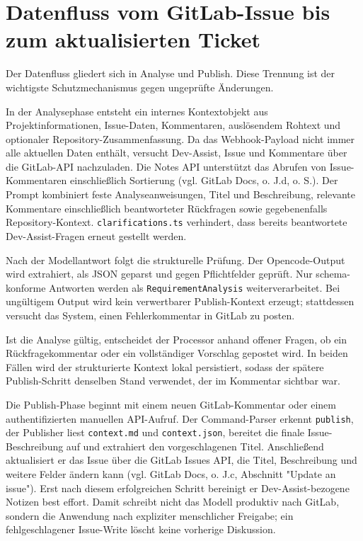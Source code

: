 \documentclass[12pt,a4paper,oneside]{scrreprt}
\begin{document}
\section{Datenfluss vom GitLab-Issue bis zum aktualisierten Ticket}

Der Datenfluss gliedert sich in Analyse und Publish. Diese Trennung ist der wichtigste Schutzmechanismus gegen ungeprüfte Änderungen.

In der Analysephase entsteht ein internes Kontextobjekt aus Projektinformationen, Issue-Daten, Kommentaren, auslösendem Rohtext und optionaler Repository-Zusammenfassung. Da das Webhook-Payload nicht immer alle aktuellen Daten enthält, versucht Dev-Assist, Issue und Kommentare über die GitLab-API nachzuladen. Die Notes API unterstützt das Abrufen von Issue-Kommentaren einschließlich Sortierung (vgl. GitLab Docs, o. J.d, o. S.). Der Prompt kombiniert feste Analyseanweisungen, Titel und Beschreibung, relevante Kommentare einschließlich beantworteter Rückfragen sowie gegebenenfalls Repository-Kontext. \texttt{clarifications.ts} verhindert, dass bereits beantwortete Dev-Assist-Fragen erneut gestellt werden.

Nach der Modellantwort folgt die strukturelle Prüfung. Der Opencode-Output wird extrahiert, als JSON geparst und gegen Pflichtfelder geprüft. Nur schema-konforme Antworten werden als \texttt{RequirementAnalysis} weiterverarbeitet. Bei ungültigem Output wird kein verwertbarer Publish-Kontext erzeugt; stattdessen versucht das System, einen Fehlerkommentar in GitLab zu posten.

Ist die Analyse gültig, entscheidet der Processor anhand offener Fragen, ob ein Rückfragekommentar oder ein vollständiger Vorschlag gepostet wird. In beiden Fällen wird der strukturierte Kontext lokal persistiert, sodass der spätere Publish-Schritt denselben Stand verwendet, der im Kommentar sichtbar war.

Die Publish-Phase beginnt mit einem neuen GitLab-Kommentar oder einem authentifizierten manuellen API-Aufruf. Der Command-Parser erkennt \texttt{publish}, der Publisher liest \texttt{context.md} und \texttt{context.json}, bereitet die finale Issue-Beschreibung auf und extrahiert den vorgeschlagenen Titel. Anschließend aktualisiert er das Issue über die GitLab Issues API, die Titel, Beschreibung und weitere Felder ändern kann (vgl. GitLab Docs, o. J.c, Abschnitt "Update an issue"). Erst nach diesem erfolgreichen Schritt bereinigt er Dev-Assist-bezogene Notizen best effort. Damit schreibt nicht das Modell produktiv nach GitLab, sondern die Anwendung nach expliziter menschlicher Freigabe; ein fehlgeschlagener Issue-Write löscht keine vorherige Diskussion.
\end{document}
